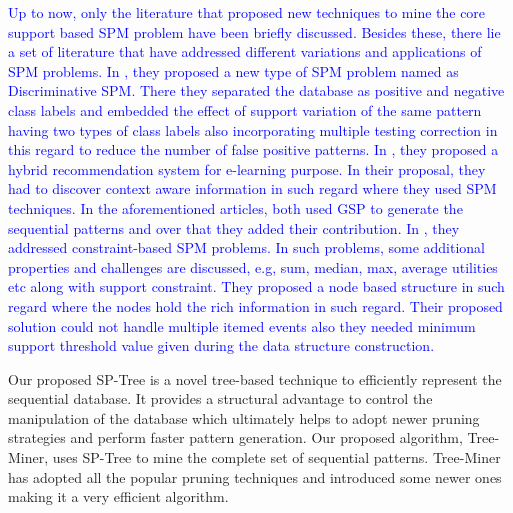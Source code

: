 \textcolor{blue}{Up to now, only the literature that proposed new techniques to mine the core support based SPM problem have been briefly discussed. Besides these, there lie a set of literature that have addressed different variations and applications of SPM problems. In \cite{he2019significance}, they proposed a new type of SPM problem named as Discriminative SPM. There they separated the database as positive and negative class labels and embedded the effect of support variation of the same pattern having two types of class labels also incorporating multiple testing correction in this regard to reduce the number of false positive patterns. In \cite{tarus2018hybrid}, they proposed a hybrid recommendation system for e-learning purpose. In their proposal, they had to discover context aware information in such regard where they used SPM techniques. In the aforementioned articles, both used GSP to generate the sequential patterns and over that they added their contribution. In \cite{hosseininasab2019constraint}, they addressed constraint-based SPM problems. In such problems, some additional properties and challenges are discussed, e.g, sum, median, max, average utilities etc along with support constraint. They proposed a node based structure in such regard where the nodes hold the rich information in such regard. Their proposed solution could not handle multiple itemed events also they needed minimum support threshold value given during the data structure construction.} 


Our proposed SP-Tree is a novel tree-based technique to efficiently represent the sequential database. It provides a structural advantage to control the manipulation of the database which ultimately helps to adopt newer pruning strategies and perform faster pattern generation. Our proposed algorithm, Tree-Miner, uses SP-Tree to mine the complete set of sequential patterns. Tree-Miner has adopted all the popular pruning techniques and introduced some newer ones making it a very efficient algorithm.


